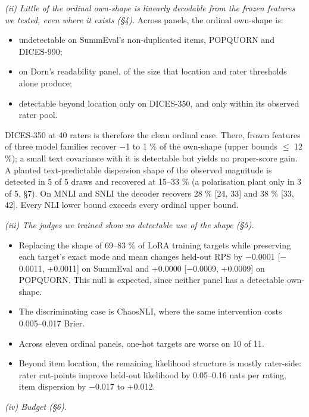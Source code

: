\documentclass{article}
\providecommand{\tightlist}{\setlength{\itemsep}{0pt}\setlength{\parskip}{0pt}}
\begin{document}
\emph{(ii) Little of the ordinal own-shape is linearly decodable from the frozen features we tested, even where it exists (\S{}4).} Across panels, the ordinal own-shape is:

\begin{itemize}
\tightlist
\item
  undetectable on SummEval's non-duplicated items, POPQUORN and DICES-990;
\item
  on Dorn's readability panel, of the size that location and rater thresholds alone produce;
\item
  detectable beyond location only on DICES-350, and only within its observed rater pool.
\end{itemize}

DICES-350 at 40 raters is therefore the clean ordinal case. There, frozen features of three model families recover $-$1 to 1 \% of the own-shape (upper bounds $\leq$ 12 \%); a small text covariance with it is detectable but yields no proper-score gain. A planted text-predictable dispersion shape of the observed magnitude is detected in 5 of 5 draws and recovered at 15--33 \% (a polarisation plant only in 3 of 5, \S{}7). On MNLI and SNLI the decoder recovers 28 \% {[}24, 33{]} and 38 \% {[}33, 42{]}. Every NLI lower bound exceeds every ordinal upper bound.

\emph{(iii) The judges we trained show no detectable use of the shape (\S{}5).}

\begin{itemize}
\tightlist
\item
  Replacing the shape of 69--83 \% of LoRA training targets while preserving each target's exact mode and mean changes held-out RPS by $-$0.0001 {[}$-$0.0011, +0.0011{]} on SummEval and +0.0000 {[}$-$0.0009, +0.0009{]} on POPQUORN. This null is expected, since neither panel has a detectable own-shape.
\item
  The discriminating case is ChaosNLI, where the same intervention costs 0.005--0.017 Brier.
\item
  Across eleven ordinal panels, one-hot targets are worse on 10 of 11.
\item
  Beyond item location, the remaining likelihood structure is mostly rater-side: rater cut-points improve held-out likelihood by 0.05--0.16 nats per rating, item dispersion by $-$0.017 to +0.012.
\end{itemize}

\emph{(iv) Budget (\S{}6).}
\end{document}
